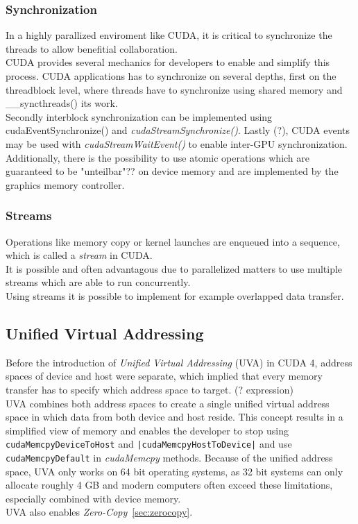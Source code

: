 \subsubsection{Synchronization}
In a highly parallized enviroment like CUDA, it is critical to synchronize the threads to allow benefitial collaboration.\\
CUDA provides several mechanics for developers to enable and simplify this process. CUDA applications has to synchronize on several depths, first on the threadblock level, where threads have to synchronize using shared memory and \_\_syncthreads() its work.\\
Secondly interblock synchronization can be implemented using cudaEventSynchronize() and \emph{cudaStreamSynchronize()}. Lastly (?), CUDA events may be used with \emph{cudaStreamWaitEvent()} to enable inter-GPU synchronization.\\
Additionally, there is the possibility to use atomic operations which are guaranteed to be "unteilbar"?? on device memory and are implemented by the graphics memory controller. 
\subsubsection{Streams}
\label{sec:streams}
Operations like memory copy or kernel launches are enqueued into a sequence, which is called a \emph{stream} in CUDA.\\
It is possible and often advantagous due to parallelized matters to use multiple streams which are able to run concurrently.\\
Using streams it is possible to implement for example overlapped data transfer.
\subsection{Unified Virtual Addressing}
\label{sec:uva}
Before the introduction of \emph{Unified Virtual Addressing} (UVA) in CUDA 4, address spaces of device and host were separate, which implied that every memory transfer has to specify which address space to target. (? expression)\\
UVA combines both address spaces to create a single unified virtual address space in which data from both device and host reside. This concept results in a simplified view of memory and enables the developer to stop using \texttt{cudaMemcpyDeviceToHost} and \texttt{|cudaMemcpyHostToDevice|} and use \texttt{cudaMemcpyDefault} in \emph{cudaMemcpy} methods.
Because of the unified address space, UVA only works on 64 bit operating systems, as 32 bit systems can only allocate roughly 4 GB and modern computers often exceed these limitations, especially combined with device memory.\\
UVA also enables \emph{Zero-Copy}~\ref{sec:zerocopy}.
